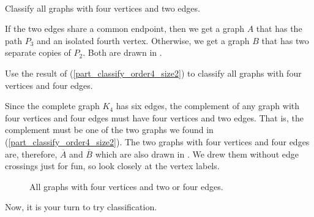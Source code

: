 \begin{exam}
\label{exam_using_complements_classify_graphs}
~
    \begin{apart}
        \item \label{part_classify_order4_size2} Classify all graphs with four vertices and two edges.
            \begin{soln}
                If the two edges share a common endpoint, then we get a graph $A$ that has the path $P_3$ and an isolated fourth vertex.  Otherwise, we get a graph $B$ that has two separate copies of $P_2$.  Both are drawn in . 
            \end{soln}
        \item Use the result of (\ref{part_classify_order4_size2}) to classify all graphs with four vertices and four edges.
            \begin{soln}
                Since the complete graph $K_4$ has six edges, the complement of any graph with four vertices and four edges must have four vertices and two edges. That is, the complement must be one of the two graphs we found in (\ref{part_classify_order4_size2}).  The two graphs with four vertices and four edges are, therefore, $\overline{A}$ and $\overline{B}$ which are also drawn in . We drew them without edge crossings just for fun, so look closely at the vertex labels.
            \end{soln}
            \begin{figure}[hbtp]
                \centering
                
                \caption{All graphs with four vertices and two or four edges.}
                \label{fig_classify_order4_size2_or_size4}
            \end{figure}  
    \end{apart}
\end{exam}
  
Now, it is your turn to try classification.

